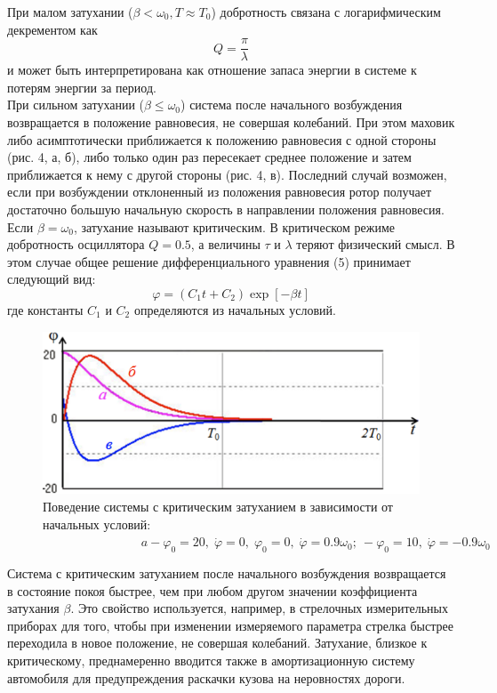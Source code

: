\documentclass[a4paper]{article}
\begin{document}
При малом затухании ($\beta<\omega_0, T\approx T_0$) добротность связана с
логарифмическим декрементом как
\begin{equation}
	Q=\dfrac{\pi}{\lambda}
\end{equation}
и может быть интерпретирована как отношение запаса энергии в
системе к потерям энергии за период.\\
При сильном затухании ($\beta \leq \omega_0$) система после начального
возбуждения возвращается в положение равновесия, не совершая колебаний. При этом маховик либо асимптотически приближается к положению равновесия с одной стороны (рис. 4, а,
б), либо только один раз пересекает среднее положение и затем
приближается к нему с другой стороны (рис. 4, в). Последний
случай возможен, если при возбуждении отклоненный из положения равновесия ротор получает достаточно большую начальную
скорость в направлении положения равновесия.\\
Если $\beta=\omega_0$, затухание называют критическим. В критическом режиме добротность осциллятора $Q=0.5$, а величины $\tau$
и $\lambda$ теряют физический смысл. В этом случае общее решение
дифференциального уравнения (5) принимает следующий вид:
\begin{equation}
	\varphi=(C_1t+C_2)\exp{[-\beta t]}
\end{equation}
где константы $C_1$ и $C_2$ определяются из начальных условий.
\begin{figure}[H]
	\begin{center}
	\includegraphics[scale=0.4]{pick_4.png}
	\caption{Поведение системы с критическим затуханием в зависимости
	от начальных условий:\\
$\text{} \hspace{95pt} a-\varphi_0=20, \; \dot{\varphi}=0, \; \varphi_0=0, \; \dot{\varphi}=0.9\omega_0; \: -\varphi_0=10, \; \dot{\varphi}=-0.9\omega_0$}
	\end{center}
\end{figure}
Система с критическим затуханием после начального возбуждения возвращается в состояние покоя быстрее, чем при любом другом значении коэффициента затухания $\beta$. Это свойство
используется, например, в стрелочных измерительных приборах
для того, чтобы при изменении измеряемого параметра стрелка
быстрее переходила в новое положение, не совершая колебаний.
Затухание, близкое к критическому, преднамеренно вводится также в амортизационную систему автомобиля для предупреждения
раскачки кузова на неровностях дороги.
\end{document}
